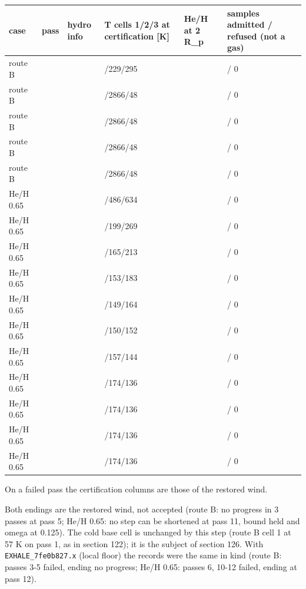 \documentclass[english,a4paper]{my_memo}
\begin{document}
{\def\LTcaptype{none} %
{\small
\begin{longtable}[]{@{}>{\raggedright\arraybackslash}p{\dimexpr(\linewidth-12\tabcolsep)/6\relax}>{\raggedright\arraybackslash}p{\dimexpr(\linewidth-12\tabcolsep)/6\relax}>{\raggedright\arraybackslash}p{\dimexpr(\linewidth-12\tabcolsep)/6\relax}>{\raggedright\arraybackslash}p{\dimexpr(\linewidth-12\tabcolsep)/6\relax}>{\raggedright\arraybackslash}p{\dimexpr(\linewidth-12\tabcolsep)/6\relax}>{\raggedright\arraybackslash}p{\dimexpr(\linewidth-12\tabcolsep)/6\relax}@{}}
\toprule\noalign{}
case & pass & hydro info & T cells 1/2/3 at certification {[}K{]} & He/H at 2 R\_p & samples admitted / refused (not a gas) \\
\midrule\noalign{}
\endhead
\bottomrule\noalign{}
\endlastfoot
route B & 1 & 0 & 57/229/295 & 0.1463 & 515 / 0 \\
route B & 2 & 0 & 1488/2866/48 & 0.06041 & 1768 / 0 \\
route B & 3 & 1 & 1488/2866/48 & 0.06041 & 8527 / 0 \\
route B & 4 & 1 & 1488/2866/48 & 0.06041 & 8580 / 0 \\
route B & 5 & 1 & 1488/2866/48 & 0.06041 & 8564 / 0 \\
He/H 0.65 & 1 & 0 & 86/486/634 & 0.3813 & 586 / 0 \\
He/H 0.65 & 2 & 0 & 85/199/269 & 0.3689 & 439 / 0 \\
He/H 0.65 & 3 & 0 & 85/165/213 & 0.3524 & 377 / 0 \\
He/H 0.65 & 4 & 0 & 84/153/183 & 0.3398 & 377 / 0 \\
He/H 0.65 & 5 & 0 & 82/149/164 & 0.3279 & 378 / 0 \\
He/H 0.65 & 6 & 0 & 80/150/152 & 0.3163 & 376 / 0 \\
He/H 0.65 & 7 & 0 & 76/157/144 & 0.3037 & 377 / 0 \\
He/H 0.65 & 8 & 0 & 73/174/136 & 0.291 & 376 / 0 \\
He/H 0.65 & 9 & 1 & 73/174/136 & 0.291 & 8052 / 0 \\
He/H 0.65 & 10 & 1 & 73/174/136 & 0.291 & 8056 / 0 \\
He/H 0.65 & 11 & 1 & 73/174/136 & 0.291 & 8057 / 0 \\
\end{longtable}
}
}

On a failed pass the certification columns are those of the restored wind.

Both endings are the restored wind, not accepted (route B: no progress in 3 passes at pass 5; He/H 0.65: no step can be shortened at pass 11, bound held and omega at 0.125). The cold base cell is unchanged by this step (route B cell 1 at 57 K on pass 1, as in section 122); it is the subject of section 126. With \texttt{EXHALE\_7fe0b827.x} (local floor) the records were the same in kind (route B: passes 3-5 failed, ending no progress; He/H 0.65: passes 6, 10-12 failed, ending at pass 12).
\end{document}
